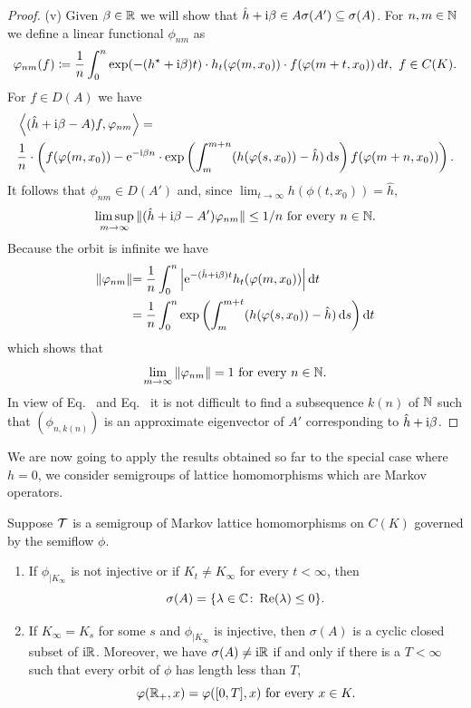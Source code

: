 \begin{proof}
    (v) Given $\beta \in \mathbb{R}$ we will show that $\hat{h} + \mathrm{i}\beta \in A\sigma(A') \subseteq \sigma(A)$.
    For $n,m \in \mathbb{N}$ we define a linear functional $\phi_{nm}$ as 
\[  
	\phi_{nm}(f) \coloneq \frac{1}{n}\int_{0}^{n} \exp(-(h^{\star}+\im\beta )t)\cdot h_{t}(\phi(m,x_{0}))\cdot f(\phi(m+t,x_{0})) \dt, \ f\in C(K).
\]
For $f \in D(A)$ we have 
	\begin{align*}
	&\left\langle(\hat{h}+\im\beta -A)f,\phi_{nm}\right\rangle = \\
	&  \frac{1}{n}\cdot\left(f(\phi(m,x_{0})) - \eu^{-\im\beta  n}\cdot %
	\exp\left(\int_{m}^{m+n} (h(\phi(s,x_{0}))-\hat{h})\ds \right)f(\phi(m+n,x_{0}))\right).
	\end{align*}
It follows that $\phi_{nm} \in D(A')$ and, since $\lim_{t\to\infty} h(\phi(t,x_{0})) = \hat{h}$,
\begin{equation}\label{eq:b3-4.13}
	\limsup_{m\to\infty} \|(\hat{h}+\im\beta -A')\phi_{nm}\| \leq 1/n \text{ for every } n \in \N.
\end{equation}
Because the orbit is infinite we have
	\begin{align*}
	\|\phi_{nm}\| & {= \frac{1}{n}\int_{0}^{n} \left|\eu^{-(\hat{h}+\im\beta )t} h_{t}(\phi(m,x_{0}))\right| \dt} \\
	& {= \frac{1}{n}\int_{0}^{n} \exp\left(\int_{m}^{m+t} (h(\phi(s,x_{0}))-\hat{h})\ds \right)\dt}
	\end{align*}
which shows that
\begin{equation}\label{eq:b3-4.14}
	\lim_{m\to\infty} \|\phi_{nm}\| = 1 \text{ for every } n \in \N.
\end{equation}
In view of Eq.~ and Eq.~ it is not difficult to find a subsequence $k(n)$ of\/ $\mathbb{N}$ such that $(\phi_{n,k(n)})$ is an approximate eigenvector of\/ $A'$ corresponding to $\hat{h} + \mathrm{i}\beta$.
\end{proof}
We are now going to apply the results obtained so far to the special case where $h = 0$, \ie we consider semigroups of lattice homomorphisms which are Markov operators.
\begin{theorem}\label{thm:b3-4.9}
	Suppose $\mathcal{T}$ is a semigroup of Markov lattice homomorphisms on $C(K)$ governed by the semiflow $\phi$.
	\begin{enumerate}[\upshape (i)]
		\item 
		If\/ $\phi_{|K_{\infty}}$ is not injective or if\/ $K_{t} \neq K_{\infty}$ for every $t < \infty$, then \[
        \sigma(A) = \{\lambda \in \C \colon \Re(\lambda) \leq 0\} .
		\]
		\item 
		If\/ $K_{\infty} = K_{s}$ for some $s$ and $\phi_{|K_{\infty}}$ is injective, then $\sigma(A)$ is a cyclic closed subset of\/ $\mathrm{i} \mathbb{R}$.
		Moreover, we have $\sigma(A) \neq \mathrm{i}\mathbb{R}$ if and only if there is a $T < \infty$ such that every orbit of\/ $\phi$ has length less than $T$, \ie 
        \[
        \phi(\R_{+},x) = \phi([0,T],x) \text{ for every } x \in K .
        \]
	\end{enumerate}
\end{theorem}
